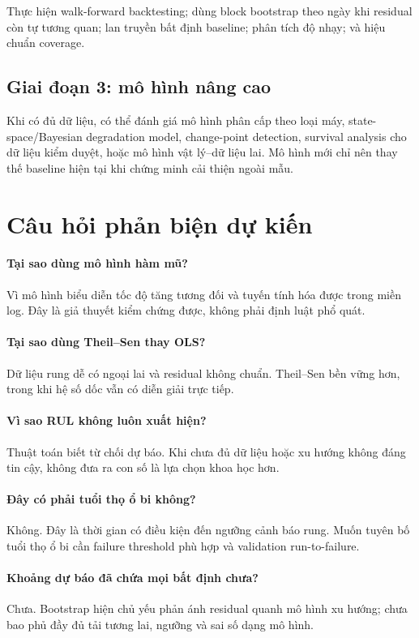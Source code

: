\documentclass[12pt,a4paper]{article}
\begin{document}
Thực hiện walk-forward backtesting; dùng block bootstrap theo ngày khi residual còn tự tương quan; lan truyền bất định baseline; phân tích độ nhạy; và hiệu chuẩn coverage.

\subsection{Giai đoạn 3: mô hình nâng cao}

Khi có đủ dữ liệu, có thể đánh giá mô hình phân cấp theo loại máy, state-space/Bayesian degradation model, change-point detection, survival analysis cho dữ liệu kiểm duyệt, hoặc mô hình vật lý--dữ liệu lai. Mô hình mới chỉ nên thay thế baseline hiện tại khi chứng minh cải thiện ngoài mẫu.

\section{Câu hỏi phản biện dự kiến}

\paragraph{Tại sao dùng mô hình hàm mũ?}
Vì mô hình biểu diễn tốc độ tăng tương đối và tuyến tính hóa được trong miền log. Đây là giả thuyết kiểm chứng được, không phải định luật phổ quát.

\paragraph{Tại sao dùng Theil--Sen thay OLS?}
Dữ liệu rung dễ có ngoại lai và residual không chuẩn. Theil--Sen bền vững hơn, trong khi hệ số dốc vẫn có diễn giải trực tiếp.

\paragraph{Vì sao RUL không luôn xuất hiện?}
Thuật toán biết từ chối dự báo. Khi chưa đủ dữ liệu hoặc xu hướng không đáng tin cậy, không đưa ra con số là lựa chọn khoa học hơn.

\paragraph{Đây có phải tuổi thọ ổ bi không?}
Không. Đây là thời gian có điều kiện đến ngưỡng cảnh báo rung. Muốn tuyên bố tuổi thọ ổ bi cần failure threshold phù hợp và validation run-to-failure.

\paragraph{Khoảng dự báo đã chứa mọi bất định chưa?}
Chưa. Bootstrap hiện chủ yếu phản ánh residual quanh mô hình xu hướng; chưa bao phủ đầy đủ tải tương lai, ngưỡng và sai số dạng mô hình.
\end{document}
